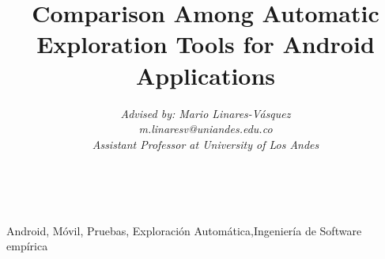 \documentclass[conference]{IEEEtran}
\begin{document}
\title{Comparison Among Automatic Exploration Tools for Android Applications}

\author{
\textit{Advised by: Mario Linares-Vásquez}\\
\textit{m.linaresv@uniandes.edu.co}\\
\textit{Assistant Professor at University of Los Andes}
}

\maketitle

\\

\begin{IEEEkeywords}
Android, Móvil, Pruebas, Exploración Automática,Ingeniería de Software empírica
\end{IEEEkeywords}















\end{document}
